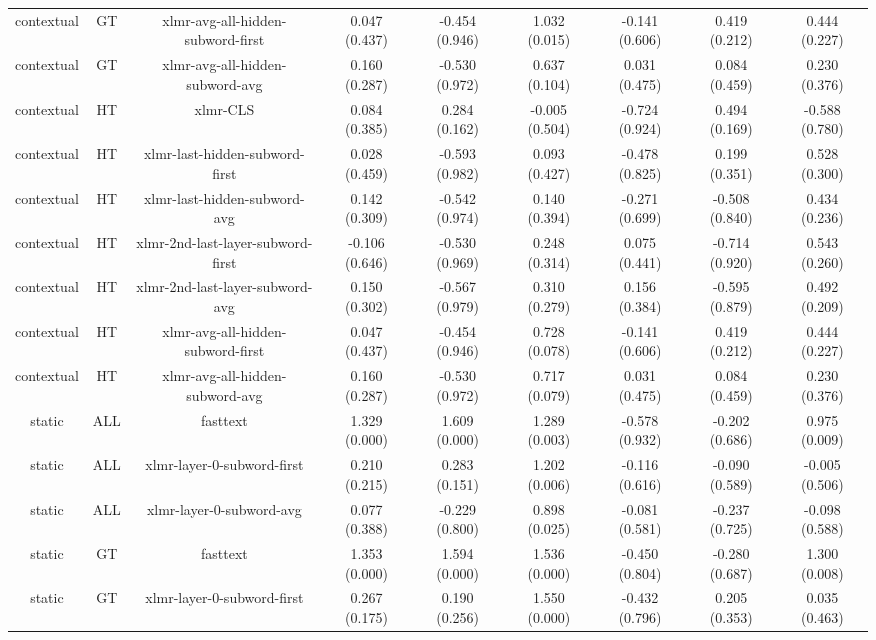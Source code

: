 \begin{sidewaystable}[htb]
\begin{tabular}{@{}ccccccccc@{}}
        contextual & GT & xlmr-avg-all-hidden-subword-first & 0.047 (0.437) & -0.454 (0.946) & 1.032 (0.015) & -0.141 (0.606) & 0.419 (0.212) & 0.444 (0.227) \\
        contextual & GT & xlmr-avg-all-hidden-subword-avg & 0.160 (0.287) & -0.530 (0.972) & 0.637 (0.104) & 0.031 (0.475) & 0.084 (0.459) & 0.230 (0.376) \\
        contextual & HT & xlmr-CLS & 0.084 (0.385) & 0.284 (0.162) & -0.005 (0.504) & -0.724 (0.924) & 0.494 (0.169) & -0.588 (0.780) \\
        contextual & HT & xlmr-last-hidden-subword-first & 0.028 (0.459) & -0.593 (0.982) & 0.093 (0.427) & -0.478 (0.825) & 0.199 (0.351) & 0.528 (0.300) \\
        contextual & HT & xlmr-last-hidden-subword-avg & 0.142 (0.309) & -0.542 (0.974) & 0.140 (0.394) & -0.271 (0.699) & -0.508 (0.840) & 0.434 (0.236) \\
        contextual & HT & xlmr-2nd-last-layer-subword-first & -0.106 (0.646) & -0.530 (0.969) & 0.248 (0.314) & 0.075 (0.441) & -0.714 (0.920) & 0.543 (0.260) \\
        contextual & HT & xlmr-2nd-last-layer-subword-avg & 0.150 (0.302) & -0.567 (0.979) & 0.310 (0.279) & 0.156 (0.384) & -0.595 (0.879) & 0.492 (0.209) \\
        contextual & HT & xlmr-avg-all-hidden-subword-first & 0.047 (0.437) & -0.454 (0.946) & 0.728 (0.078) & -0.141 (0.606) & 0.419 (0.212) & 0.444 (0.227) \\
        contextual & HT & xlmr-avg-all-hidden-subword-avg & 0.160 (0.287) & -0.530 (0.972) & 0.717 (0.079) & 0.031 (0.475) & 0.084 (0.459) & 0.230 (0.376) \\
        static & ALL & fasttext & 1.329 (0.000) & 1.609 (0.000) & 1.289 (0.003) & -0.578 (0.932) & -0.202 (0.686) & 0.975 (0.009) \\
        static & ALL & xlmr-layer-0-subword-first & 0.210 (0.215) & 0.283 (0.151) & 1.202 (0.006) & -0.116 (0.616) & -0.090 (0.589) & -0.005 (0.506) \\
        static & ALL & xlmr-layer-0-subword-avg & 0.077 (0.388) & -0.229 (0.800) & 0.898 (0.025) & -0.081 (0.581) & -0.237 (0.725) & -0.098 (0.588) \\
        static & GT & fasttext & 1.353 (0.000) & 1.594 (0.000) & 1.536 (0.000) & -0.450 (0.804) & -0.280 (0.687) & 1.300 (0.008) \\
        static & GT & xlmr-layer-0-subword-first & 0.267 (0.175) & 0.190 (0.256) & 1.550 (0.000) & -0.432 (0.796) & 0.205 (0.353) & 0.035 (0.463) \\

\end{tabular}
\end{sidewaystable}
